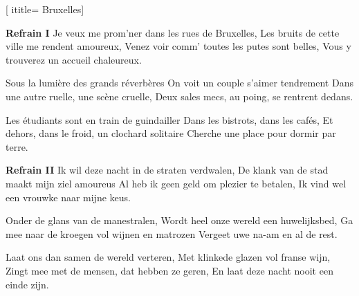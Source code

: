  [
ititle= {Bruxelles}]


\beginchorus
\textbf {Refrain I}
Je veux me prom'ner dans les rues de Bruxelles,
Les bruits de cette ville me rendent amoureux,
Venez voir comm' toutes les putes sont belles,
Vous y trouverez un accueil chaleureux.
\endchorus

\beginverse
Sous la lumière des grands réverbères
On voit un couple s'aimer tendrement
Dans une autre ruelle, une scène cruelle,
Deux sales mecs, au poing, se rentrent dedans.
\endverse

\beginverse
Les étudiants sont en train de guindailler
Dans les bistrots, dans les cafés,
Et dehors, dans le froid, un clochard solitaire
Cherche une place pour dormir par terre.
\endverse

\beginchorus
\textbf {Refrain II}
Ik wil deze nacht in de straten verdwalen,
De klank van de stad maakt mijn ziel amoureus
Al heb ik geen geld om plezier te betalen,
Ik vind wel een vrouwke naar mijne keus.
\endchorus

\beginverse
Onder de glans van de manestralen,
Wordt heel onze wereld een huwelijksbed,
Ga mee naar de kroegen vol wijnen en matrozen
Vergeet uwe na-am en al de rest.
\endverse

\beginverse
Laat ons dan samen de wereld verteren,
Met klinkede glazen vol franse wijn,
Zingt mee met de mensen, dat hebben ze geren,
En laat deze nacht nooit een einde zijn.
\endverse

\endsong